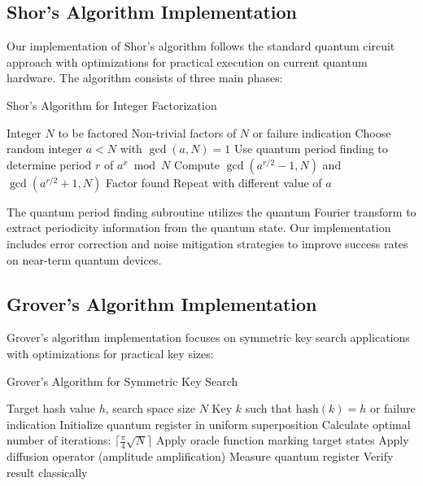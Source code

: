 \documentclass[11pt]{article}
\begin{document}
\subsection{Shor's Algorithm Implementation}

Our implementation of Shor's algorithm follows the standard quantum circuit approach with optimizations for practical execution on current quantum hardware. The algorithm consists of three main phases:

\begin{algorithm}
\caption{Shor's Algorithm for Integer Factorization}
\begin{algorithmic}[1]
\REQUIRE Integer $N$ to be factored
\ENSURE Non-trivial factors of $N$ or failure indication
\STATE Choose random integer $a < N$ with $\gcd(a, N) = 1$
\STATE Use quantum period finding to determine period $r$ of $a^x \bmod N$
    \STATE Compute $\gcd(a^{r/2} - 1, N)$ and $\gcd(a^{r/2} + 1, N)$
        \RETURN Factor found
    \ENDIF
\ENDIF
\STATE Repeat with different value of $a$
\end{algorithmic}
\end{algorithm}

The quantum period finding subroutine utilizes the quantum Fourier transform to extract periodicity information from the quantum state. Our implementation includes error correction and noise mitigation strategies to improve success rates on near-term quantum devices.

\subsection{Grover's Algorithm Implementation}

Grover's algorithm implementation focuses on symmetric key search applications with optimizations for practical key sizes:

\begin{algorithm}
\caption{Grover's Algorithm for Symmetric Key Search}
\begin{algorithmic}[1]
\REQUIRE Target hash value $h$, search space size $N$
\ENSURE Key $k$ such that $\text{hash}(k) = h$ or failure indication
\STATE Initialize quantum register in uniform superposition
\STATE Calculate optimal number of iterations: $\lceil \frac{\pi}{4}\sqrt{N} \rceil$
    \STATE Apply oracle function marking target states
    \STATE Apply diffusion operator (amplitude amplification)
\ENDFOR
\STATE Measure quantum register
\STATE Verify result classically
\end{algorithmic}
\end{algorithm}
\end{document}
